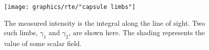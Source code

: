 \begin{figure}[htbp] %
   \centering
   \texttt{[image: graphics/rte/"capsule limbs"]} 
   \caption[The measured intensity is the integral along the line of sight]{The measured intensity is the integral along the line of sight. Two such limbs, $\gamma_{1}$ and $\gamma_{2}$, are shown here. The shading represents the value of some scalar field.}
   \label{fig:limbs}
\end{figure}





\endinput %